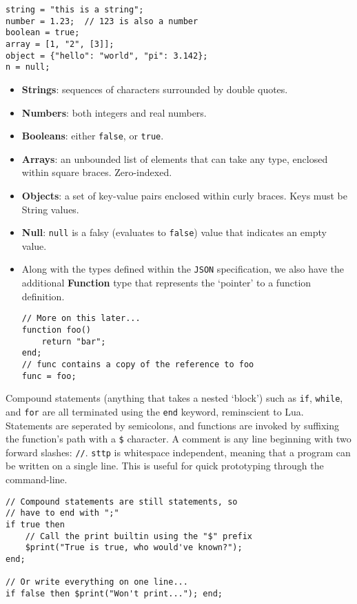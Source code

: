 \begin{verbatim}
string = "this is a string";
number = 1.23;  // 123 is also a number
boolean = true;
array = [1, "2", [3]];
object = {"hello": "world", "pi": 3.142};
n = null;
\end{verbatim}

\begin{itemize}
    \item \textbf{Strings}: sequences of characters surrounded by double quotes.
    \item \textbf{Numbers}: both integers and real numbers.
    \item \textbf{Booleans}: either \verb|false|, or \verb|true|.
    \item \textbf{Arrays}: an unbounded list of elements that can take any type, enclosed within square braces. Zero-indexed.
    \item \textbf{Objects}: a set of key-value pairs enclosed within curly braces. Keys must be String values.
    \item \textbf{Null}: \verb|null| is a falsy (evaluates to \verb|false|) value that indicates an empty value.
    \item Along with the types defined within the \verb|JSON| specification, we also have the additional \textbf{Function} type that represents the `pointer' to a function definition.
    \begin{verbatim}
// More on this later...
function foo()
    return "bar";
end;
// func contains a copy of the reference to foo
func = foo;    
    \end{verbatim}
\end{itemize}

Compound statements (anything that takes a nested `block') such as \verb|if|, \verb|while|, and \verb|for| are all terminated using the \verb|end| keyword, reminscient to Lua. Statements are seperated by semicolons, and functions are invoked by suffixing the function's path with a \verb|$| character. A comment is any line beginning with two forward slashes: \verb|//|. \verb|sttp| is whitespace independent, meaning that a program can be written on a single line. This is useful for quick prototyping through the command-line.

\begin{verbatim}
// Compound statements are still statements, so
// have to end with ";"
if true then
    // Call the print builtin using the "$" prefix
    $print("True is true, who would've known?");
end;

// Or write everything on one line...
if false then $print("Won't print..."); end;
\end{verbatim}

